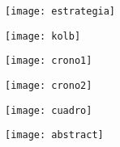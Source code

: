 \documentclass[12pt]{beamer}
\begin{document}
\begin{frame}
\begin{center}
\texttt{[image: estrategia]}
\end{center}
\end{frame}
\begin{frame}
\begin{center}
\texttt{[image: kolb]}
\end{center}
\end{frame}
\begin{frame}
\begin{center}
\texttt{[image: crono1]}
\end{center}
\end{frame}
\begin{frame}
\begin{center}
\texttt{[image: crono2]}
\end{center}
\end{frame}
\begin{frame}
\begin{center}
\texttt{[image: cuadro]}
\end{center}
\end{frame}
\begin{frame}
\begin{center}
\texttt{[image: abstract]}
\end{center}
\end{frame}
\end{document}
